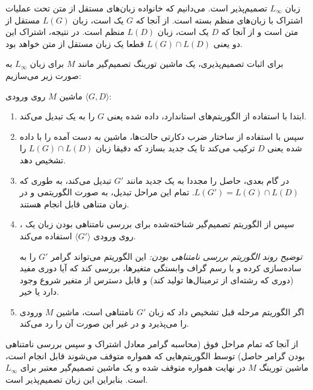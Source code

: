  زبان $L_\infty$ {تصمیم‌پذیر} است.
می‌دانیم که خانواده زبان‌های مستقل از متن تحت عملیات اشتراک با زبان‌های منظم بسته است. از آنجا که $G$ یک  است، زبان $L(G)$ مستقل از متن است و از آنجا که $D$ یک  است، زبان $L(D)$ منظم است. در نتیجه، اشتراک این دو یعنی $L(G) \cap L(D)$ قطعا یک زبان مستقل از متن خواهد بود.

برای اثبات تصمیم‌پذیری، یک ماشین تورینگ تصمیم‌گیر مانند $M$ برای زبان $L_\infty$ به صورت زیر می‌سازیم:

ماشین $M$ روی ورودی $\langle G, D \rangle$:
\begin{enumerate}
    \item ابتدا با استفاده از الگوریتم‌های استاندارد،  داده شده یعنی $G$ را به یک  تبدیل می‌کند.
    \item سپس با استفاده از ساختار ضرب دکارتی حالت‌ها، ماشین  به دست آمده را با  داده شده یعنی $D$ ترکیب می‌کند تا یک  جدید بسازد که دقیقا زبان $L(G) \cap L(D)$ را تشخیص دهد.
    \item در گام بعدی،  حاصل را مجددا به یک  جدید مانند $G'$ تبدیل می‌کند، به طوری که $L(G') = L(G) \cap L(D)$. تمام این مراحل تبدیل، به صورت الگوریتمی و در زمان متناهی قابل انجام هستند.
    \item سپس از الگوریتم تصمیم‌گیر شناخته‌شده برای بررسی نامتناهی بودن زبان یک ، روی ورودی $\langle G' \rangle$ استفاده می‌کند. 
    
    \textit{توضیح روند الگوریتم بررسی نامتناهی بودن:} این الگوریتم می‌تواند گرامر $G'$ را به  ساده‌سازی کرده و با رسم گراف وابستگی متغیرها، بررسی کند که آیا دوری مفید (دوری که رشته‌ای از ترمینال‌ها تولید کند) و قابل دسترس از متغیر شروع وجود دارد یا خیر.
    
    \item اگر الگوریتم مرحله قبل تشخیص داد که زبان $G'$ نامتناهی است، ماشین $M$ ورودی را می‌پذیرد و در غیر این صورت آن را رد می‌کند.
\end{enumerate}

از آنجا که تمام مراحل فوق (محاسبه گرامر معادل اشتراک و سپس بررسی نامتناهی بودن گرامر حاصل) توسط الگوریتم‌هایی که همواره متوقف می‌شوند قابل انجام است، ماشین تورینگ $M$ در نهایت همواره متوقف شده و یک ماشین تصمیم‌گیر معتبر برای $L_\infty$ است. بنابراین این زبان تصمیم‌پذیر است.
